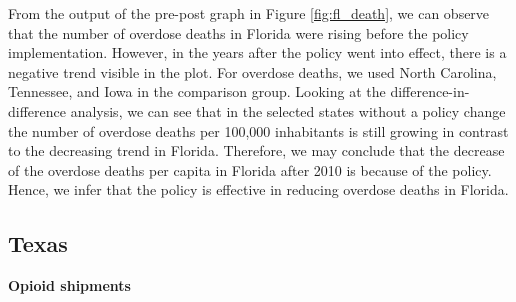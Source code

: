 \documentclass[12pt,letterpaper]{article}
\begin{document}
From the output of the pre-post graph in Figure \ref{fig:fl_death}, we can observe that the number of overdose deaths in Florida were rising before the policy implementation. However, in the years after the policy went into effect, there is a negative trend visible in the plot. For overdose deaths, we used North Carolina, Tennessee, and Iowa in the comparison group. Looking at the difference-in-difference analysis, we can see that in the selected states without a policy change the number of overdose deaths per 100,000 inhabitants is still growing in contrast to the decreasing trend in Florida.  Therefore, we may conclude that the decrease of the overdose deaths per capita in Florida after 2010 is because of the policy. Hence, we infer that the policy is effective in reducing overdose deaths in Florida.

\subsection{Texas}
\textbf{Opioid shipments}
\end{document}
